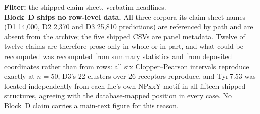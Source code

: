 \begin{table}[htbp]
\begin{tabular}{llp{10.6cm}}
\bottomrule
\end{tabular}
\begin{flushleft}\scriptsize
\textbf{Filter:} the shipped claim sheet, verbatim headlines. \\ \textbf{Block~D ships no row-level data.} All three corpora its claim sheet names (D1 14{,}000, D2 2{,}370 and D3 25{,}810 predictions) are referenced by path and are absent from the archive; the five shipped CSVs are panel metadata. Twelve of twelve claims are therefore prose-only in whole or in part, and what could be recomputed was recomputed from summary statistics and from deposited coordinates rather than from rows: all six Clopper--Pearson intervals reproduce exactly at $n = 50$, D3's 22 clusters over 26 receptors reproduce, and Tyr\,7.53 was located independently from each file's own NPxxY motif in all fifteen shipped structures, agreeing with the database-mapped position in every case. No Block~D claim carries a main-text figure for this reason.
\end{flushleft}
\end{table}
